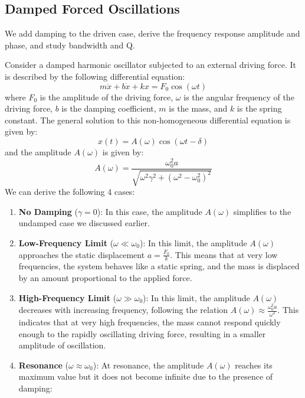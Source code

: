 \documentclass[11pt]{report}
\begin{document}
\subsection{Damped Forced Oscillations}
We add damping to the driven case, derive the frequency response amplitude and phase, and study bandwidth and Q.
\begin{definition}
    Consider a damped harmonic oscillator subjected to an external driving force. It is described by the following differential equation:
    \begin{equation}
        m\ddot{x} + b\dot{x} + kx = F_0 \cos(\omega t)
    \end{equation}
    where \( F_0 \) is the amplitude of the driving force, \( \omega \) is the angular frequency of the driving force, \( b \) is the damping coefficient, \( m \) is the mass, and \( k \) is the spring constant. The general solution to this non-homogeneous differential equation is given by:
    \begin{equation}
        x(t) = A(\omega)\cos(\omega t - \delta)
    \end{equation}
    and the amplitude \( A(\omega) \) is given by:
    \begin{equation}
        A(\omega) = \frac{\omega_0^2 a}{\sqrt{\omega^2 \gamma^2 + (\omega^2 - \omega_0^2)^2}}
    \end{equation}
    We can derive the following 4 cases:
    \begin{enumerate}
        \item \textbf{No Damping} (\( \gamma = 0 \)): In this case, the amplitude \( A(\omega) \) simplifies to the undamped case we discussed earlier.
        \item \textbf{Low-Frequency Limit} (\( \omega \ll \omega_0 \)): In this limit, the amplitude \( A(\omega) \) approaches the static displacement \( a = \frac{F_0}{k} \). This means that at very low frequencies, the system behaves like a static spring, and the mass is displaced by an amount proportional to the applied force.
        \item \textbf{High-Frequency Limit} (\( \omega \gg \omega_0 \)): In this limit, the amplitude \( A(\omega) \) decreases with increasing frequency, following the relation \( A(\omega) \approx \frac{\omega_0^2 a}{\omega^2} \). This indicates that at very high frequencies, the mass cannot respond quickly enough to the rapidly oscillating driving force, resulting in a smaller amplitude of oscillation.
        \item \textbf{Resonance} (\( \omega \approx \omega_0 \)): At resonance, the amplitude \( A(\omega) \) reaches its maximum value but it does not become infinite due to the presence of damping: 

\end{enumerate}
\end{definition}
\end{document}

